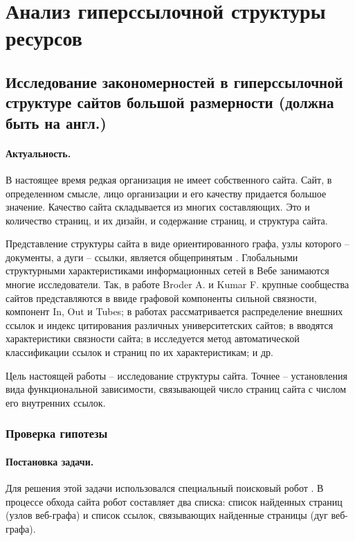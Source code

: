 \section{Анализ гиперссылочной структуры ресурсов}\label{sec:ch1/sec4}

\subsection{Исследование закономерностей в гиперссылочной структуре сайтов большой размерности (должна быть на англ.)}\label{subsec:ch1/sec4/sub5}

\paragraph{Актуальность.} В настоящее время редкая организация не имеет собственного сайта. Сайт, в определенном смысле, лицо организации и его качеству придается большое значение. Качество сайта складывается из многих составляющих. Это и количество страниц, и их дизайн, и содержание страниц, и структура сайта.

Представление структуры сайта в виде ориентированного графа, узлы которого -- документы, а дуги -- ссылки, является общепринятым \cite{BroderKumarMaghoul}. Глобальными структурными характеристиками информационных сетей в Вебе занимаются многие исследователи. Так, в работе Broder A. и Kumar F. \cite{BroderKumarMaghoul} крупные сообщества сайтов представляются в ввиде графовой компоненты сильной связности, компонент In, Out и Tubes; в работах \cite{Thelwall,ThelwallZuccala,ThelwallWilkinsonMusgrove,PechnikovNwohiri} рассматривается распределение внешних ссылок и индекс цитирования различных университетских сайтов; в \cite{BlekanovSergeevMaksimovBOWTIE} вводятся характеристики связности сайта; в \cite{KenekayoroBuckleyThelwall} исследуется метод автоматической классификации ссылок и страниц по их характеристикам; и др.

Цель настоящей работы – исследование структуры сайта. Точнее – установления вида функциональной зависимости, связывающей число страниц сайта с числом его внутренних ссылок.

\subsubsection{Проверка гипотезы}

\paragraph{Постановка задачи.} Для решения этой задачи использовался специальный поисковый робот \cite{BlekanovSergeevMartynenko}. В процессе обхода сайта робот составляет два списка: список найденных страниц (узлов веб-графа) и список ссылок, связывающих найденные страницы (дуг веб-графа).

